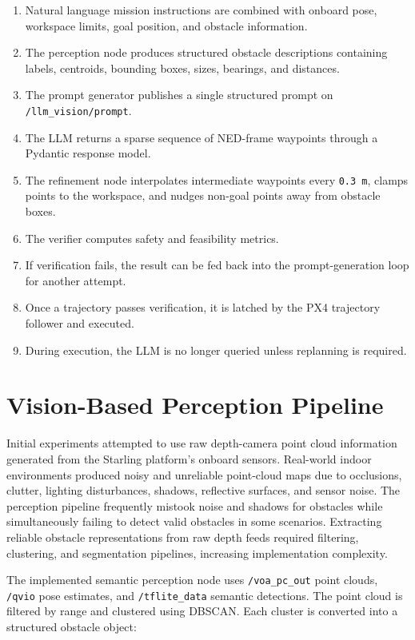 \documentclass[11pt]{article}
\begin{document}
\begin{enumerate}
  \item Natural language mission instructions are combined with onboard pose, workspace limits, goal position, and obstacle information.
  \item The perception node produces structured obstacle descriptions containing labels, centroids, bounding boxes, sizes, bearings, and distances.
  \item The prompt generator publishes a single structured prompt on \texttt{/llm\_vision/prompt}.
  \item The LLM returns a sparse sequence of NED-frame waypoints through a Pydantic response model.
  \item The refinement node interpolates intermediate waypoints every \texttt{0.3 m}, clamps points to the workspace, and nudges non-goal points away from obstacle boxes.
  \item The verifier computes safety and feasibility metrics.
  \item If verification fails, the result can be fed back into the prompt-generation loop for another attempt.
  \item Once a trajectory passes verification, it is latched by the PX4 trajectory follower and executed.
  \item During execution, the LLM is no longer queried unless replanning is required.
\end{enumerate}

\section{Vision-Based Perception Pipeline}

Initial experiments attempted to use raw depth-camera point cloud information generated from the Starling platform's onboard sensors. Real-world indoor environments produced noisy and unreliable point-cloud maps due to occlusions, clutter, lighting disturbances, shadows, reflective surfaces, and sensor noise. The perception pipeline frequently mistook noise and shadows for obstacles while simultaneously failing to detect valid obstacles in some scenarios. Extracting reliable obstacle representations from raw depth feeds required filtering, clustering, and segmentation pipelines, increasing implementation complexity.

The implemented semantic perception node uses \texttt{/voa\_pc\_out} point clouds, \texttt{/qvio} pose estimates, and \texttt{/tflite\_data} semantic detections. The point cloud is filtered by range and clustered using DBSCAN. Each cluster is converted into a structured obstacle object:
\end{document}
